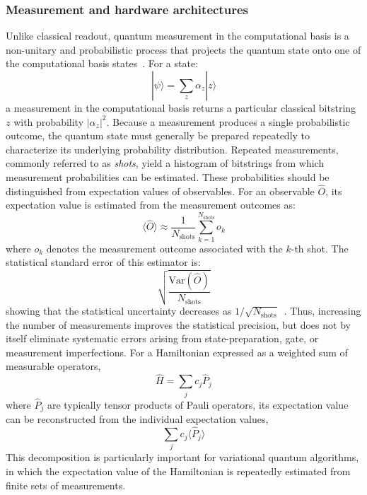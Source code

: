 \subsubsection{Measurement and hardware architectures}
Unlike classical readout, quantum measurement in the computational basis is a non-unitary and probabilistic process that projects the quantum state onto one of the computational basis states~\cite{nielsen2010quantum,preskill1998quantum}. For a state:
\begin{equation}
|\psi\rangle=\sum_z\alpha_z|z\rangle
\end{equation}
a measurement in the computational basis returns a particular classical bitstring $z$ with probability $|\alpha_z|^2$.
Because a measurement produces a single probabilistic outcome, the quantum state must generally be prepared repeatedly to characterize its underlying probability distribution. Repeated measurements, commonly referred to as \textit{shots}, yield a histogram of bitstrings from which measurement probabilities can be estimated. These probabilities should be distinguished from expectation values of observables. For an observable $\hat{O}$, its expectation value is estimated from the measurement outcomes as:
\begin{equation}
\langle\hat{O}\rangle
\approx
\frac{1}{N_{\mathrm{shots}}}
\sum_{k=1}^{N_{\mathrm{shots}}}o_k
\end{equation}
where $o_k$ denotes the measurement outcome associated with the $k$-th shot. The statistical standard error of this estimator is:
\begin{equation}
\sqrt{\frac{\mathrm{Var}(\hat{O})}{N_{\mathrm{shots}}}}
\end{equation}
showing that the statistical uncertainty decreases as $1/\sqrt{N_{\mathrm{shots}}}$~\cite{mcclean2016theory}. Thus, increasing the number of measurements improves the statistical precision, but does not by itself eliminate systematic errors arising from state-preparation, gate, or measurement imperfections.
For a Hamiltonian expressed as a weighted sum of measurable operators,
\begin{equation}
\hat{H}=\sum_j c_j\hat{P}_j
\end{equation}
where $\hat{P}_j$ are typically tensor products of Pauli operators, its expectation value can be reconstructed from the individual expectation values,
\begin{equation}
\sum_j c_j\langle\hat{P}_j\rangle
\end{equation}
This decomposition is particularly important for variational quantum algorithms, in which the expectation value of the Hamiltonian is repeatedly estimated from finite sets of measurements.

